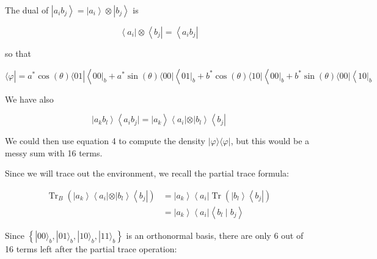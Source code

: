 \documentclass[10pt]{article}
\begin{document}
The dual of $\left|a_{i} b_{j}\right\rangle=\left|a_{i}\right\rangle \otimes\left|b_{j}\right\rangle$ is

$$
  \left\langle a_{i}\right| \otimes\left\langle b_{j}\right|=\left\langle a_{i} b_{j}\right|
$$

so that

$$
  \langle\varphi|=a^{*} \cos (\theta)\langle 01|\left\langle\left. 00\right|_{b}+a^{*} \sin (\theta)\langle 00|\left\langle\left. 01\right|_{b}+b^{*} \cos (\theta)\langle 10|\left\langle\left. 00\right|_{b}+b^{*} \sin (\theta)\langle 00|\left\langle\left. 10\right|_{b}\right.\right.\right.\right.
$$

We have also

$$
  \left|a_{k} b_{l}\right\rangle\left\langle a_{i} b_{j}|=| a_{k}\right\rangle\left\langle a_{i}|\otimes| b_{l}\right\rangle\left\langle b_{j}\right|
$$

We could then use equation 4 to compute the density $|\varphi\rangle\langle\varphi|$, but this would be a messy sum with 16 terms.

Since we will trace out the environment, we recall the partial trace formula:

$$
  \begin{aligned}
    \operatorname{Tr}_{B}\left(\left|a_{k}\right\rangle\left\langle a_{i}|\otimes| b_{l}\right\rangle\left\langle b_{j}\right|\right) & =\left|a_{k}\right\rangle\left\langle a_{i}\right| \operatorname{Tr}\left(\left|b_{l}\right\rangle\left\langle b_{j}\right|\right) \\
                                                                                                                                      & =\left|a_{k}\right\rangle\left\langle a_{i}\right|\left\langle b_{l} \mid b_{j}\right\rangle
  \end{aligned}
$$

Since $\left\{|00\rangle_{b},|01\rangle_{b},|10\rangle_{b},|11\rangle_{b}\right\}$ is an orthonormal basis, there are only 6 out of 16 terms left after the partial trace operation:
\end{document}
